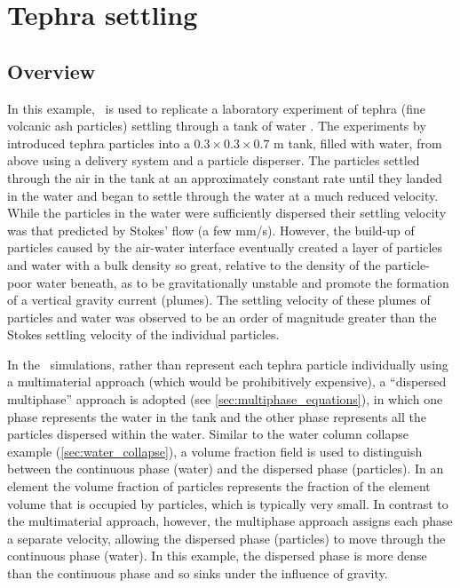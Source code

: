 
\section{Tephra settling}
\label{sec:tephra_settling}

\subsection{Overview}
In this example, \fluidity\ is used to replicate a laboratory experiment of tephra (fine volcanic ash particles) settling through a tank of water \citep{carey1997}. The experiments by \cite{carey1997} introduced tephra particles into a $0.3\times 0.3\times 0.7$ m tank, filled with water, from above using a delivery system and a particle disperser. The particles settled through the air in the tank at an approximately constant rate until they landed in the water and began to settle through the water at a much reduced velocity. While the particles in the water were sufficiently dispersed their settling velocity was that predicted by Stokes' flow (a few mm/s).  However, the build-up of particles caused by the air-water interface eventually created a layer of particles and water with a bulk density so great, relative to the density of the particle-poor water beneath, as to be gravitationally unstable and promote the formation of a vertical gravity current (plumes). The settling velocity of these plumes of
particles
and water was observed to be an order of magnitude greater than the Stokes settling velocity of the individual particles.

In the \fluidity\ simulations, rather than represent each tephra particle individually using a multimaterial approach (which would be prohibitively expensive), a ``dispersed multiphase'' approach is adopted (see \ref{sec:multiphase_equations}), in which one phase represents the water in the tank and the other phase represents all the particles dispersed within the water. Similar to the water column collapse example (\ref{sec:water_collapse}), a volume fraction field is used to distinguish between the continuous phase (water) and the dispersed phase (particles). In an element the volume fraction of particles represents the fraction of the element volume that is occupied by particles, which is typically very small. In contrast to the multimaterial approach, however, the multiphase approach assigns each phase a separate velocity, allowing the dispersed phase (particles) to move through the continuous phase (water). In this example, the dispersed phase is more dense than the continuous phase and so sinks under
the influence of gravity.

